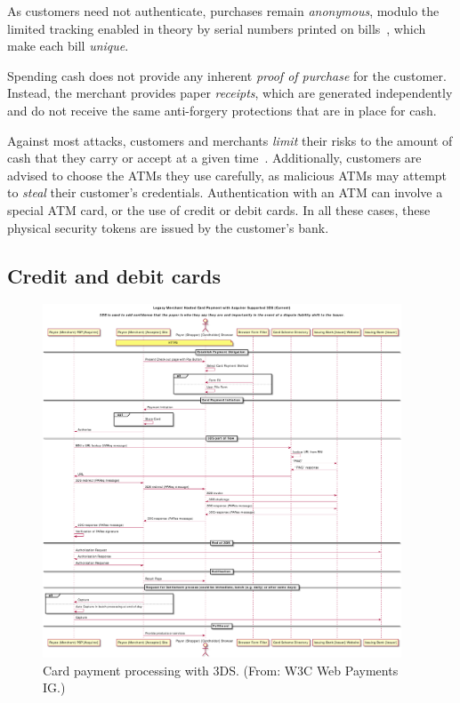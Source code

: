 \documentclass{llncs}
\begin{document}
As customers need not authenticate, purchases remain {\em
  anonymous}, modulo the limited tracking enabled in theory
by serial numbers printed on bills~\cite{pets2004kuegler},
which make each bill {\em unique}.

Spending cash does not provide any inherent {\em proof of purchase}
for the customer. Instead, the merchant provides paper
{\em receipts}, which are generated independently and do not receive
the same anti-forgery protections that are in place for cash.

Against most attacks, customers and merchants {\em limit} their risks
to the amount of cash that they carry or accept at a given
time~\cite{Bankrate}.  Additionally, customers are advised to choose
the ATMs they use carefully, as malicious ATMs may attempt to {\em
  steal} their customer's credentials.  Authentication with an ATM can
involve a special ATM card, or the use of credit or
debit cards.  In all these cases, these physical security tokens are
issued by the customer's bank.


\subsection{Credit and debit cards}

\begin{figure}[h!]
\begin{center}
\includegraphics[width=0.95\textwidth]{figs/cc3ds.pdf}
\end{center}
\caption{Card payment processing with 3DS. (From: W3C Web Payments IG.)}
\label{fig:cc3ds}
\end{figure}
\end{document}

